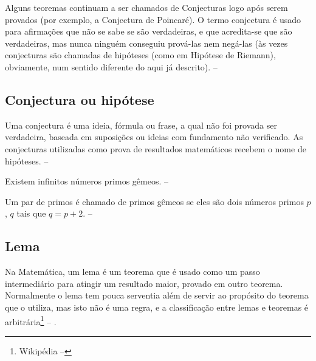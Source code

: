Alguns teoremas continuam a ser chamados de Conjecturas logo após serem provados (por exemplo, a Conjectura de Poincaré). O termo conjectura é usado para afirmações que não se sabe se são verdadeiras, e que acredita-se que são verdadeiras, mas nunca ninguém conseguiu prová-las nem negá-las (às vezes conjecturas são chamadas de hipóteses (como em Hipótese de Riemann), obviamente, num sentido diferente do aqui já descrito). -- \showfont


\subsection{Conjectura ou hipótese}

Uma conjectura é uma ideia, fórmula ou frase, a qual não foi provada ser verdadeira, baseada em suposições ou ideias com fundamento não verificado. As conjecturas utilizadas como prova de resultados matemáticos recebem o nome de hipóteses. -- \showfont



\begin{conjectura}
    Existem infinitos números primos gêmeos. -- \showfont
\end{conjectura}

Um par de primos é chamado de primos gêmeos se eles são dois números primos $p$, $q$ tais que $q = p + 2$. -- \showfont



\subsection{Lema}

Na Matemática, um lema é um teorema que é usado como um passo intermediário para atingir um resultado maior, provado em outro teorema. Normalmente o lema tem pouca serventia além de servir ao propósito do teorema que o utiliza, mas isto não é uma regra, e a classificação entre lemas e teoremas é arbitrária\footnote{Wikipédia -- \showfont} -- \showfont.



